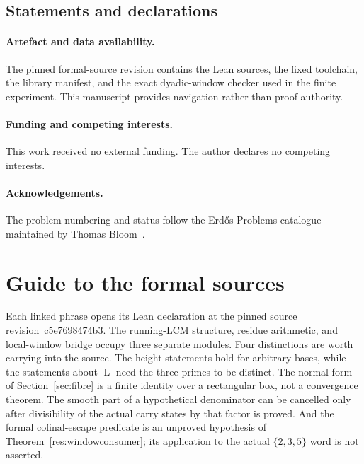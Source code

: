 \documentclass[11pt]{article}
\renewcommand{\commitshort}{c5e7698474b3}
\newcommand{\Lprefix}{\operatorname{L}}
\begin{document}
\subsection*{Statements and declarations}

\paragraph{Artefact and data availability.} The
\href{\sourceurl}{pinned formal-source revision} contains the Lean sources, the
fixed toolchain, the library manifest, and the exact dyadic-window checker used
in the finite experiment.  This manuscript provides navigation rather than
proof authority.

\paragraph{Funding and competing interests.} This work received no external
funding.  The author declares no competing interests.

\paragraph{Acknowledgements.} The problem numbering and status follow the
Erd\H{o}s Problems catalogue maintained by Thomas Bloom~\cite{erdosproblems}.

\appendix
\section{Guide to the formal sources}\label{app:index}

Each linked phrase opens its Lean declaration at the pinned source
revision~\commitshort.  The running-LCM structure, residue arithmetic, and
local-window bridge occupy three separate modules.  Four distinctions are
worth carrying into the source.  The height statements hold for arbitrary
bases, while the statements about $\Lprefix$ need the three primes to be
distinct.  The normal form of Section~\ref{sec:fibre} is a finite identity over
a rectangular box, not a convergence theorem.  The smooth part of a
hypothetical denominator can be cancelled only after divisibility of the actual
carry states by that factor is proved.  And the formal cofinal-escape predicate
is an unproved hypothesis of Theorem~\ref{res:windowconsumer}; its application
to the actual $\{2,3,5\}$ word is not asserted.
\end{document}
